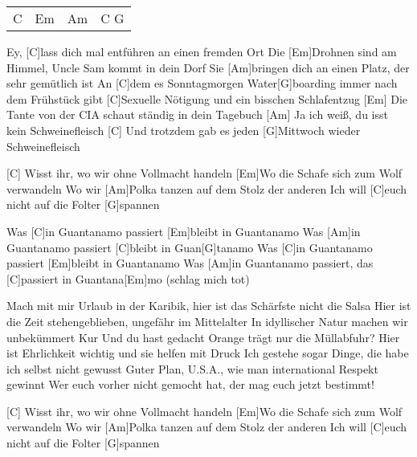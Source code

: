 



\begin{guitar}
	{\footnotesize\begin{tabular}{|l|l|l|l|}
			C & Em & Am & C G
	\end{tabular}}	
	
	Ey, [C]lass dich mal entführen an einen fremden Ort
	Die [Em]Drohnen sind am Himmel, Uncle Sam kommt in dein Dorf
	Sie [Am]bringen dich an einen Platz, der sehr gemütlich ist
	An [C]dem es Sonntagmorgen Water[G]boarding immer nach dem Frühstück gibt
	[C]Sexuelle Nötigung und ein bisschen Schlafentzug
	[Em] Die Tante von der CIA schaut ständig in dein Tagebuch
	[Am] Ja ich weiß, du isst kein Schweinefleisch
	[C] Und trotzdem gab es jeden [G]Mittwoch wieder Schweinefleisch
	
	[C] Wisst ihr, wo wir ohne Vollmacht handeln
	[Em]Wo die Schafe sich zum Wolf verwandeln
	Wo wir [Am]Polka tanzen auf dem Stolz der anderen
	Ich will [C]euch nicht auf die Folter [G]spannen
	
	\begin{highlightbar}
		Was [C]in Guantanamo passiert [Em]bleibt in Guantanamo
		Was [Am]in Guantanamo passiert [C]bleibt in Guan[G]tanamo
		Was [C]in Guantanamo passiert [Em]bleibt in Guantanamo
		Was [Am]in Guantanamo passiert, das [C]passiert in Guantana[Em]mo (schlag mich tot)
	\end{highlightbar}
	\pagebreak
	Mach mit mir Urlaub in der Karibik, hier ist das Schärfste nicht die Salsa
	Hier ist die Zeit stehengeblieben, ungefähr im Mittelalter
	In idyllischer Natur machen wir unbekümmert Kur
	Und du hast gedacht Orange trägt nur die Müllabfuhr?
	Hier ist Ehrlichkeit wichtig und sie helfen mit Druck
	Ich gestehe sogar Dinge, die habe ich selbst nicht gewusst
	Guter Plan, U.S.A., wie man international Respekt gewinnt
	Wer euch vorher nicht gemocht hat, der mag euch jetzt bestimmt!
	
	[C] Wisst ihr, wo wir ohne Vollmacht handeln
	[Em]Wo die Schafe sich zum Wolf verwandeln
	Wo wir [Am]Polka tanzen auf dem Stolz der anderen
	Ich will [C]euch nicht auf die Folter [G]spannen
	

\end{guitar}
